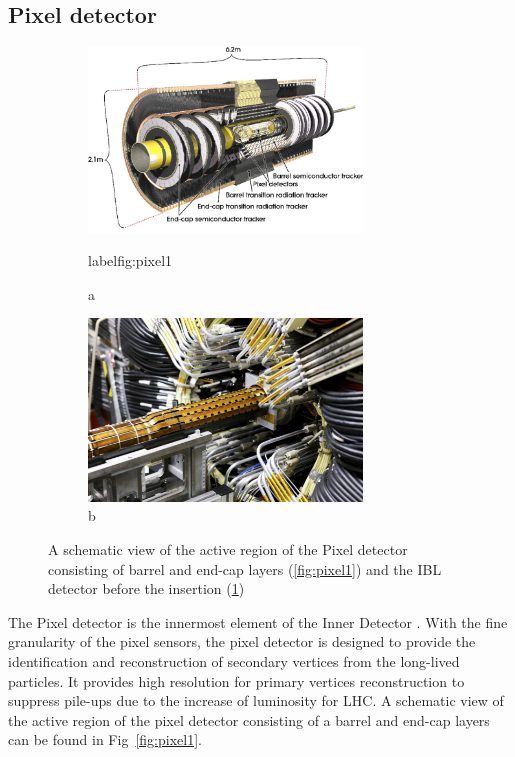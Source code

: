 \subsection{Pixel detector}
\label{sec:pixel}

\begin{figure}[htbp!]
\begin{subfigure}{.5\textwidth}
    \centering
    \includegraphics[width=0.8\textwidth]{chapters/c4/figures/pixel}
    \caption{a}
    label{fig:pixel1}
\end{subfigure}%
\begin{subfigure}{.5\textwidth}
    \centering
    \includegraphics[width=0.8\textwidth]{chapters/c4/figures/IBL}
    \caption{b}
    \label{fig:pixel2}
\end{subfigure}
\caption{A schematic view of the active region of the Pixel detector consisting of barrel and end-cap layers (\ref{fig:pixel1}) and the IBL detector before the insertion (\ref{fig:pixel2})}
\label{fig:pixel}
\end{figure}

\par The Pixel detector is the innermost element of the Inner Detector \cite{Hirono:2641635}. With the fine granularity of the pixel sensors, the pixel detector is designed to provide the identification and reconstruction of secondary vertices from the long-lived particles. It provides high resolution for primary vertices reconstruction to suppress pile-ups due to the increase of luminosity for LHC. A schematic view of the active region of the pixel detector consisting of a barrel and end-cap layers can be found in Fig~\ref{fig:pixel1}.

